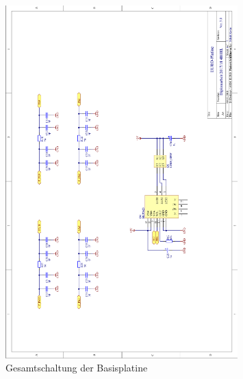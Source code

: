 \begin{figure}[htb]\ContinuedFloat
    \centering
    \includegraphics[width=0.8\textwidth]{Schuh/Pictures/Basis-Schaltung6}
    \caption[Gesamtschaltung der Basisplatine]{Gesamtschaltung der \gls{Basisplatine}}
\end{figure}
